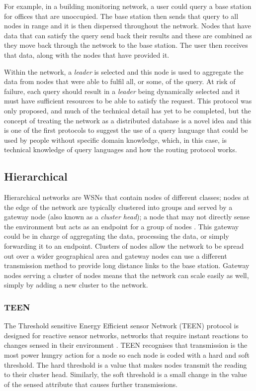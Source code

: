 	For example, in a building monitoring network, a user could query a base station for offices that are unoccupied. The base station then sends that query to all nodes in range and it is then dispersed throughout the network. Nodes that have data that can satisfy the query send back their results and these are combined as they move back through the network to the base station. The user then receives that data, along with the nodes that have provided it.

Within the network, a \textit{leader} is selected and this node is used to aggregate the data from nodes that were able to fulfil all, or some, of the query. At risk of failure, each query should result in a \textit{leader} being dynamically selected and it must have sufficient resources to be able to satisfy the request. This protocol was only proposed, and much of the technical detail has yet to be completed, but the concept of treating the network as a distributed database is a novel idea and this is one of the first protocols to suggest the use of a query language that could be used by people without specific domain knowledge, which, in this case, is technical knowledge of query languages and how the routing protocol works.

\subsection{Hierarchical}
	Hierarchical networks are WSNs that contain nodes of different classes; nodes at the edge of the network are typically clustered into groups and served by a gateway node (also known as a \textit{cluster head}); a node that may not directly sense the environment but acts as an endpoint for a group of nodes \cite{Akkaya2005}. This gateway could be in charge of aggregating the data, processing the data, or simply forwarding it to an endpoint. Clusters of nodes allow the network to be spread out over a wider geographical area and gateway nodes can use a different transmission method to provide long distance links to the base station. Gateway nodes serving a cluster of nodes means that the network can scale easily as well, simply by adding a new cluster to the network.

\subsubsection{TEEN}
	The Threshold sensitive Energy Efficient sensor Network (TEEN) protocol is designed for reactive sensor networks, networks that require instant reactions to changes sensed in their environment \cite{Manjeshwar2001}. TEEN recognises that transmission is the most power hungry action for a node so each node is coded with a hard and soft threshold. The hard threshold is a value that makes nodes transmit the reading to their cluster head. Similarly, the soft threshold is a small change in the value of the sensed attribute that causes further transmissions.

